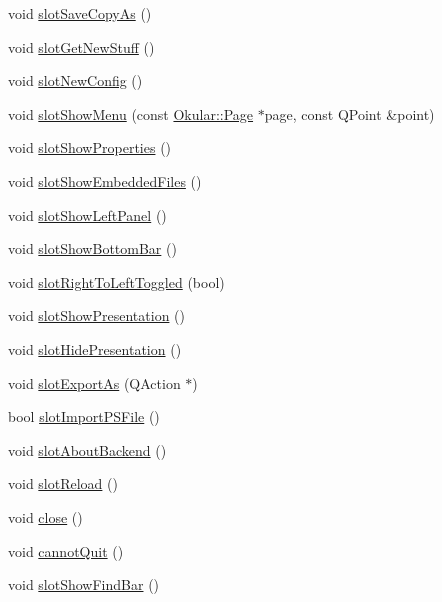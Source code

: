 \begin{DoxyCompactItemize}
void \hyperlink{classOkular_1_1Part_a80e63d8e2eb2490f09a0696268fea568}{slot\+Save\+Copy\+As} ()
\item 
void \hyperlink{classOkular_1_1Part_ad626d5e8b12e8fa6774ef0affaffcb38}{slot\+Get\+New\+Stuff} ()
\item 
void \hyperlink{classOkular_1_1Part_a19b3133f95b677e0f5a17fc0d3cae8c2}{slot\+New\+Config} ()
\item 
void \hyperlink{classOkular_1_1Part_a8b10f21181b6b35ba85586081ea4055f}{slot\+Show\+Menu} (const \hyperlink{classOkular_1_1Page}{Okular\+::\+Page} $\ast$page, const Q\+Point \&point)
\item 
void \hyperlink{classOkular_1_1Part_ac03386c9716e336a1118bddb1043e0ce}{slot\+Show\+Properties} ()
\item 
void \hyperlink{classOkular_1_1Part_ae3507834103024f1d02e63d705892a2e}{slot\+Show\+Embedded\+Files} ()
\item 
void \hyperlink{classOkular_1_1Part_ac7aa6f999e1e6acdf0318c9d2b39a061}{slot\+Show\+Left\+Panel} ()
\item 
void \hyperlink{classOkular_1_1Part_acaa1bb8adbcf3f6a575e2a6c038feb17}{slot\+Show\+Bottom\+Bar} ()
\item 
void \hyperlink{classOkular_1_1Part_a05713d196c9b67d26c01b3436d424cb9}{slot\+Right\+To\+Left\+Toggled} (bool)
\item 
void \hyperlink{classOkular_1_1Part_a1c9208bc02c4ef8e8e66a5f34b1a4465}{slot\+Show\+Presentation} ()
\item 
void \hyperlink{classOkular_1_1Part_a5144c0676e583a84410c106dca86f1e6}{slot\+Hide\+Presentation} ()
\item 
void \hyperlink{classOkular_1_1Part_aab0d45f85f4d00ddfdfbf545bee14896}{slot\+Export\+As} (Q\+Action $\ast$)
\item 
bool \hyperlink{classOkular_1_1Part_aaa0bb2c34f305a210ffc4c2bc374b64f}{slot\+Import\+P\+S\+File} ()
\item 
void \hyperlink{classOkular_1_1Part_a58f6f44e69025e7004f4e88c900f4cc5}{slot\+About\+Backend} ()
\item 
void \hyperlink{classOkular_1_1Part_abb9f05e88ba85d991c4fb4d14bcf3100}{slot\+Reload} ()
\item 
void \hyperlink{classOkular_1_1Part_a3f783ea1df40dc11e725fd15e5fb0af2}{close} ()
\item 
void \hyperlink{classOkular_1_1Part_a4f6f80955d2ea94344fdc7baa1332a29}{cannot\+Quit} ()
\item 
void \hyperlink{classOkular_1_1Part_aa2ee25d9b83be74cdbfc0eca83058d62}{slot\+Show\+Find\+Bar} ()

\end{DoxyCompactItemize}
